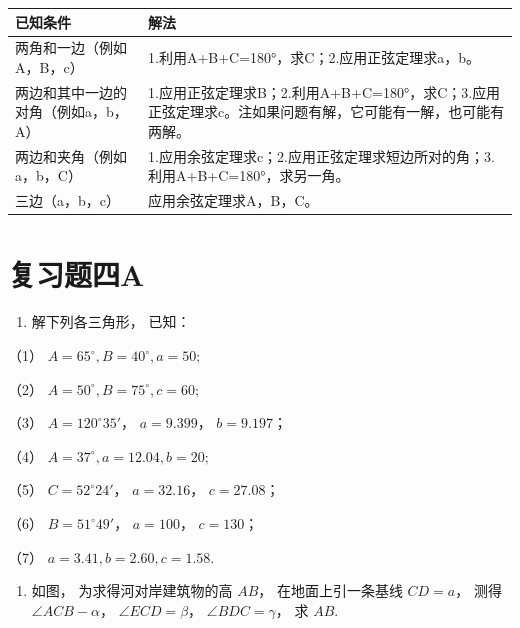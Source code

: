 {\def\LTcaptype{none} %
\begin{longtable}[]{@{}
  >{\raggedright\arraybackslash}p{}
  >{\raggedright\arraybackslash}p{}@{}}
\toprule\noalign{}
\begin{minipage}[b]{\linewidth}\raggedright
已知条件
\end{minipage} & \begin{minipage}[b]{\linewidth}\raggedright
解法
\end{minipage} \\
\midrule\noalign{}
\endhead
\bottomrule\noalign{}
\endlastfoot
两角和一边（例如A，B，c） &
1.利用A+B+C=180°，求C；2.应用正弦定理求a，b。 \\
两边和其中一边的对角（例如a，b，A） &
1.应用正弦定理求B；2.利用A+B+C=180°，求C；3.应用正弦定理求c。注如果问题有解，它可能有一解，也可能有两解。 \\
两边和夹角（例如a，b，C） &
1.应用余弦定理求c；2.应用正弦定理求短边所对的角；3.利用A+B+C=180°，求另一角。 \\
三边（a，b，c） & 应用余弦定理求A，B，C。 \\
\end{longtable}
}

\section{复习题四A}

\begin{enumerate}
\item
  解下列各三角形， 已知：
\end{enumerate}

（1） \(A = 65^{\circ}, B = 40^{\circ}, a = 50;\)

（2） \(A = 50^{\circ}, B = 75^{\circ}, c = 60;\)

（3） \(A = 120^{\circ}35'\)， \(a = 9.399\)， \(b = 9.197\)；

（4） \(A = 37^{\circ}, a = 12.04, b = 20;\)

（5） \(C = 52^{\circ}24'\)， \(a = 32.16\)， \(c = 27.08\)；

（6） \(B = 51^{\circ}49'\)， \(a = 100\)， \(c = 130\)；

（7） \(a = 3.41, b = 2.60, c = 1.58.\)

\begin{enumerate}[start=2]
\item
  如图， 为求得河对岸建筑物的高 \(AB\)， 在地面上引一条基线 \(CD = a\)，
  测得 \(\angle ACB - \alpha\)， \(\angle ECD = \beta\)，
  \(\angle BDC = \gamma\)， 求 \(AB\).
\end{enumerate}

